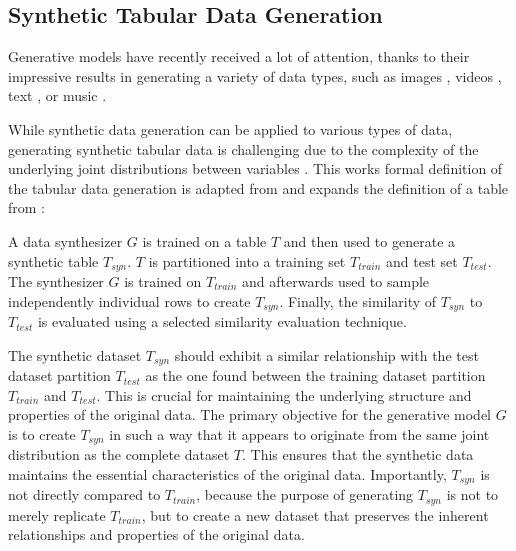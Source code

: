 \subsection{Synthetic Tabular Data Generation}
\label{sec: synthetic tabular data generation}

Generative models have recently received a lot of attention, thanks to their impressive results in generating a variety of data types, 
such as images \cite{ho2020DenoisingDiffusionProbabilistic, dhariwal2021DiffusionModelsBeat, rombach2022HighResolutionImageSynthesis}, videos \cite{ho2022VideoDiffusionModels, runwayGen1Runway}, text \cite{radford2018ImprovingLanguageUnderstanding, openai2022ChatGPTOptimizingLanguage}, or music \cite{agostinelli2023MusicLMGeneratingMusic, Forsgren_Martiros_2022}.

While synthetic data generation can be applied to various types of data, generating synthetic tabular data is challenging due to the complexity of the underlying joint distributions between variables \cite{borisov2022DeepNeuralNetworks}.
This works formal definition of the tabular data generation is adapted from \cite[p. 2]{xu2019ModelingTabularData} and expands the definition of a table from :

\begin{displayquote}
    A data synthesizer $G$ is trained on a table $T$ and then used to generate a synthetic table $T_{syn}$. %
    $T$ is partitioned into a training set $T_{train}$ and test set $T_{test}$. 
    The synthesizer $G$ is trained on $T_{train}$ and afterwards used to sample independently individual rows to create $T_{syn}$.
    Finally, the similarity of $T_{syn}$ to $T_{test}$ is evaluated using a selected similarity evaluation technique.
\end{displayquote}

The synthetic dataset $T_{syn}$ should exhibit a similar relationship with the test dataset partition $T_{test}$ 
as the one found between the training dataset partition $T_{train}$ and $T_{test}$. 
This is crucial for maintaining the underlying structure and properties of the original data.
The primary objective for the generative \gls{model} $G$ is to create $T_{syn}$ in such a way that it appears to originate from the same joint distribution as the complete dataset $T$. 
This ensures that the synthetic data maintains the essential characteristics of the original data.
Importantly, $T_{syn}$ is not directly compared to $T_{train}$, because the purpose of generating $T_{syn}$ is not to merely replicate $T_{train}$,
but to create a new dataset that preserves the inherent relationships and properties of the original data.

